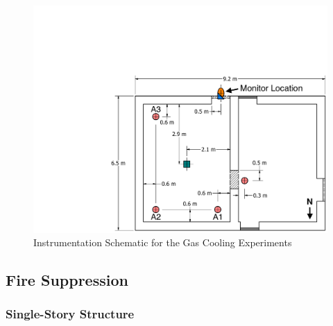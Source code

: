 \documentclass[12pt,oneside]{book}
\begin{document}
\begin{figure}[!ht]
	\includegraphics[width=\columnwidth]{../Figures/Floor_Plans/PDFs/West_Structure/DelCo_2012_West_Structure_Instrumentation}
	\caption{Instrumentation Schematic for the Gas Cooling Experiments}
	\label{fig:Gas_Cooling_Instrumentation_Dimensions}
\end{figure}

\clearpage

\subsection{Fire Suppression}
\label{subsec:Fire_Suppression_Instrumentation}

\subsubsection*{Single-Story Structure}
\end{document}
